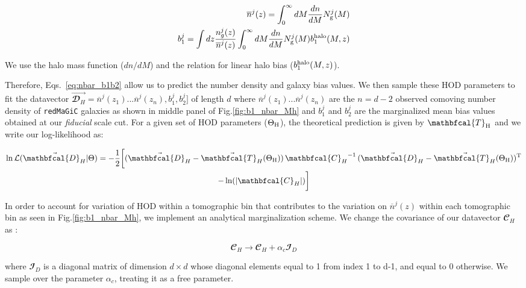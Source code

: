 \documentclass[aps, prd,twocolumn,superscriptaddress,nofootinbib,preprintnumbers]{revtex4-1}
\newcommand{\redmagic}{\texttt{redMaGiC} }
\begin{document}
\begin{linenomath*}
\begin{align}\label{eq:nbar_b1b2}
\nonumber    \overline{n}^j(z) = \int_{0}^{\infty} dM \frac{dn}{dM} N^{j}_{\rm g}(M) \\
\nonumber    b^{j}_1 = \int dz \frac{n^j_g(z)}{\overline{n}^j(z)} \int_{0}^{\infty} dM \frac{dn}{dM} N^{j}_{\rm g}(M) b^{\rm halo}_{1}(M,z)\\
\end{align}
\end{linenomath*}
We use the \cite{Tinker_2008} halo mass function ($dn/dM$) and the \cite{Tinker_2010} relation for linear halo bias ($b^{\rm halo}_{1}(M,z)$). 

Therefore, Eqs.~\ref{eq:nbar_b1b2} allow us to predict the number density and galaxy bias values. We then sample these HOD parameters to fit the datavector $\vec{\mathbfcal{D}_H} = \overline{n}^j(z_1)...\overline{n}^j(z_{n}),b^j_1,b^j_2]$ of length $d$ where $\overline{n}^j(z_1)...\overline{n}^j(z_{n})$ are the $n=d-2$ observed comoving number density of \redmagic galaxies as shown in middle panel of Fig.\ref{fig:b1_nbar_Mh} and $b^j_1$ and $b^j_2$ are the marginalized mean bias values obtained at our \textit{fiducial} scale cut. For a given set of HOD parameters ($\Theta_{\rm H}$), the theoretical prediction is given by $\mathbfcal{T}_{\rm H}$ and we write our log-likelihood as:
\begin{linenomath*}
\begin{multline}
    \ln \mathcal{L}(\vec{\mathbfcal{D}_H}|\Theta) = -\frac{1}{2} \bigg[ (\vec{\mathbfcal{D}_H} - \vec{\mathbfcal{T}_H}(\Theta_{\rm H})) \, {\mathbfcal{C}_H}^{-1} \,  (\vec{\mathbfcal{D}_H} - \vec{\mathbfcal{T}_H}(\Theta_{\rm H}))^{\rm T} \\ -  \ln(|\mathbfcal{C}_H|) \bigg]
\end{multline}
\end{linenomath*}
In order to account for variation of HOD within a tomographic bin that contributes to the variation on $\overline{n}^j(z)$ within each tomographic bin as seen in Fig.\ref{fig:b1_nbar_Mh}, we implement an analytical marginalization scheme. We change the covariance of our datavector $\mathbfcal{C}_H$ as :
\begin{linenomath*}
\begin{equation}
    \mathbfcal{C}_H \to \mathbfcal{C}_H + \alpha_{c} \mathbfcal{I}_D
\end{equation}
\end{linenomath*}
where $\mathbfcal{I}_D$ is a diagonal matrix of dimension $d\times d$ whose diagonal elements equal to 1 from index 1 to d-1, and equal to 0 otherwise. We sample over the parameter $\alpha_{c}$, treating it as a free parameter. 







\label{lastpage}

% 
%  
\end{document}
